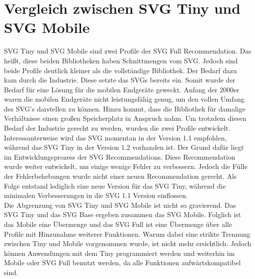 \section{Vergleich zwischen SVG Tiny und SVG Mobile}
SVG Tiny und SVG Mobile sind zwei Profile der SVG Full Recommendation. Das heißt, diese beiden Bibliotheken haben Schnittmengen vom SVG. Jedoch sind beide Profile deutlich kleiner als die vollständige Bibliothek. Der Bedarf dazu kam durch die Industrie. Diese setzte das SVGs bereits ein. Somit wurde der Bedarf für eine Lösung für die mobilen Endgeräte geweckt. Anfang der 2000er waren die mobilen Endgeräte nicht leistungsfähig genug, um den vollen Umfang des SVG's darstellen zu können. Hinzu kommt, dass die Bibliothek für damalige Verhältnisse einen großen Speicherplatz in Anspruch nahm. Um trotzdem diesen Bedarf der Industrie gerecht zu werden, wurden die zwei Profile entwickelt.\\

Interessanterweise wird das SVG momentan in der Version 1.1 empfohlen, während das SVG Tiny in der Version 1.2 vorhanden ist. Der Grund dafür liegt im Entwicklungsprozess der SVG Recommendations. Diese Recommendation wurde weiter entwickelt, um einige wenige Fehler zu verbessern. Jedoch die Fülle der Fehlerbehebungen wurde nicht einer neuen Recommendation gerecht. Als Folge entstand lediglich eine neue Version für das SVG Tiny, während die minimalen Verbesserungen in die SVG 1.1 Version einflossen.\\

Die Abgrenzung von SVG Tiny und SVG Mobile ist nicht so gravierend. Das SVG Tiny und das SVG Base ergeben zusammen das SVG Mobile. Folglich ist das Mobile eine Übermenge und das SVG Full ist eine Übermenge über alle Profile mit Hinzunahme weiterer Funktionen. Warum dabei eine strikte Trennung zwischen Tiny und Mobile vorgenommen wurde, ist nicht mehr ersichtlich. Jedoch können Anwendungen mit dem Tiny programmiert werden und weiterhin im Mobile oder SVG Full benutzt werden, da alle Funktionen aufwärtskompatibel sind.\\

